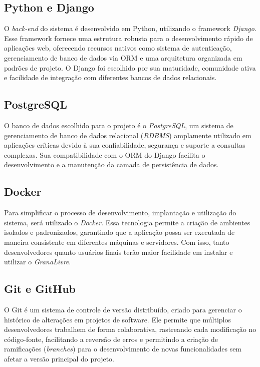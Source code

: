 \subsection{Python e Django}
O \textit{back-end} do sistema é desenvolvido em Python, utilizando o framework \textit{Django}. Esse framework fornece uma estrutura robusta para o desenvolvimento rápido de aplicações web, oferecendo recursos nativos como sistema de autenticação, gerenciamento de banco de dados via ORM e uma arquitetura organizada em padrões de projeto.  
O Django foi escolhido por sua maturidade, comunidade ativa e facilidade de integração com diferentes bancos de dados relacionais.

\subsection{PostgreSQL}
O banco de dados escolhido para o projeto é o \textit{PostgreSQL}, um sistema de gerenciamento de banco de dados relacional (\textit{RDBMS}) amplamente utilizado em aplicações críticas devido à sua confiabilidade, segurança e suporte a consultas complexas. Sua compatibilidade com o ORM do Django facilita o desenvolvimento e a manutenção da camada de persistência de dados.

\subsection{Docker}
Para simplificar o processo de desenvolvimento, implantação e utilização do sistema, será utilizado o \textit{Docker}. Essa tecnologia permite a criação de ambientes isolados e padronizados, garantindo que a aplicação possa ser executada de maneira consistente em diferentes máquinas e servidores.  
Com isso, tanto desenvolvedores quanto usuários finais terão maior facilidade em instalar e utilizar o \textit{GranaLivre}.

\subsection{Git e GitHub}
O Git é um sistema de controle de versão distribuído, criado para gerenciar o histórico de alterações em projetos de software. Ele permite que múltiplos desenvolvedores trabalhem de forma colaborativa, rastreando cada modificação no código-fonte, facilitando a reversão de erros e permitindo a criação de ramificações (\textit{branches}) para o desenvolvimento de novas funcionalidades sem afetar a versão principal do projeto.

